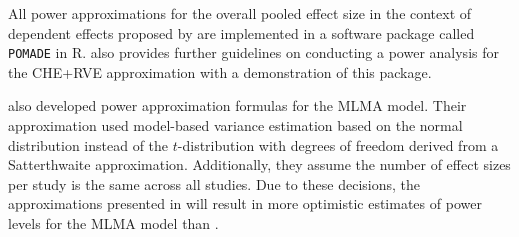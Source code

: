 All power approximations for the overall pooled effect size in the context of dependent effects proposed by \textcite{vembye2023} are implemented in a software package called \texttt{POMADE} in R.  \textcite{vembye2024} also provides further guidelines on conducting a power analysis for the CHE+RVE approximation with a demonstration of this package.        

\textcite{zhang2024} also developed power approximation formulas for the MLMA model. Their approximation used model-based variance estimation based on the normal distribution instead of the $t$-distribution with degrees of freedom derived from a Satterthwaite approximation. Additionally, they assume the number of effect sizes per study is the same across all studies. Due to these decisions, the approximations presented in \textcite{zhang2024} will result in more optimistic estimates of power levels for the MLMA model than \textcite{vembye2023} \autocite{vembye2024}.  




 
 
 

